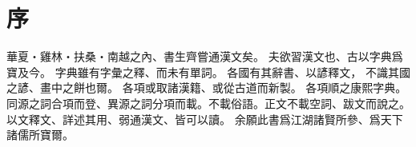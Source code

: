 \chapter*{序}
華夏・雞林・扶桑・南越之內、書生齊嘗通漢文矣。
夫欲習漢文也、古以字典爲寶及今。
字典雖有字彙之釋、而未有單詞。
各國有其辭書、以諺釋文，
不識其國之諺、畫中之餅也爾。
各項或取諸漢籍、或從古道而新製。
各項順之康熙字典。
同源之詞合項而登、異源之詞分項而載。不載俗語。正文不載空詞、跋文而說之。
以文釋文、詳述其用、弱通漢文、皆可以讀。
余願此書爲江湖諸賢所參、爲天下諸儒所寶爾。
